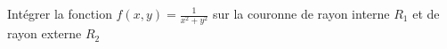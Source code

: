 
\begin{exercice}\label{exoOutilsMath-0092}

    Intégrer la fonction $f(x,y)=\frac{1}{ x^2+y^2 }$ sur la couronne de rayon interne $R_1$ et de rayon externe $R_2$ 
    

\end{exercice}
